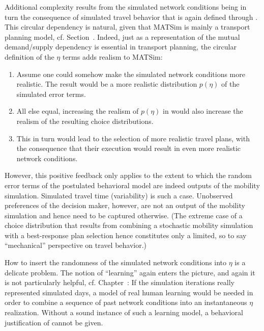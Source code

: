 Additional complexity results from the simulated network conditions
being in turn the consequence of simulated travel behavior that is
again defined through . This circular
dependency is natural, given that MATSim is mainly a transport planning
model, cf. Section~. Indeed, just as a representation
of the mutual demand/supply dependency is essential in transport planning,
the circular definition of the $\eta$ terms adds realism to MATSim:
\begin{enumerate}
\item Assume one could somehow make the simulated network conditions more
realistic. The result would be a more realistic distribution $p(\eta)$
of the simulated error terms.
\item All else equal, increasing the realism of $p(\eta)$ in 
would also increase the realism of the resulting choice distributions.
\item This in turn would lead to the selection of more realistic travel
plans, with the consequence that their execution would result in even
more realistic network conditions.
\end{enumerate}
However, this positive feedback only applies to the extent to which
the random error terms of the postulated behavioral model are indeed
outputs of the mobility simulation. Simulated travel time (variability)
is such a case. Unobserved preferences of the decision maker, however,
are not an output of the mobility simulation and hence need to be
captured otherwise. (The extreme case of a choice distribution that
results from combining a stochastic mobility simulation with a best-response
plan selection hence constitutes only a limited, so to say {}``mechanical''
perspective on travel behavior.)

How to insert the randomness of the simulated network conditions into
$\eta$ is a delicate problem. The notion of {}``learning'' again
enters the picture, and again it is not particularly helpful, cf.
Chapter~: If the simulation iterations really represented
simulated days, a model of real human learning would be needed in
order to combine a sequence of past network conditions into an instantaneous
$\eta$ realization. Without a sound instance of such a learning model,
a behavioral justification of  cannot
be given.

